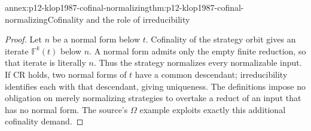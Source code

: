 \begin{annexitem}{annex:p12-klop1987-cofinal-normalizing}{thm:p12-klop1987-cofinal-normalizing}{Cofinality and the role of irreducibility}
\begin{proof}
Let \(n\) be a normal form below \(t\). Cofinality of the strategy
orbit gives an iterate \(\mathbb F^k(t)\) below \(n\).
A normal form admits only the empty finite reduction, so that iterate
is literally \(n\). Thus the strategy normalizes every normalizable
input. If CR holds, two normal forms of \(t\) have a common descendant;
irreducibility identifies each with that descendant, giving uniqueness.
The definitions impose no obligation on merely normalizing strategies
to overtake a reduct of an input that has no normal form. The source's
\(\Omega\) example exploits exactly this additional cofinality demand.
\end{proof}
\end{annexitem}


